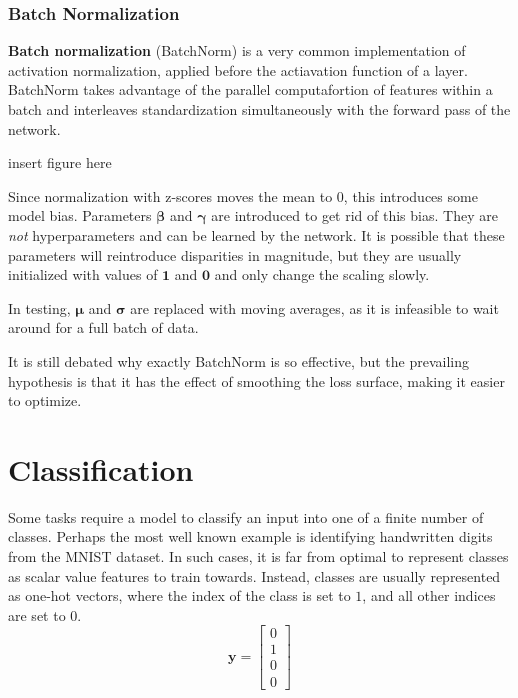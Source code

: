 \documentclass[12pt]{report}
\theoremstyle{definition}
\theoremstyle{remark}
\begin{document}
\subsubsection{Batch Normalization}
\textbf{Batch normalization} (BatchNorm) is a very common implementation of activation normalization, applied before the actiavation function of a layer. BatchNorm takes advantage of the parallel computafortion of features within a batch and interleaves standardization simultaneously with the forward pass of the network.

insert figure here

Since normalization with z-scores moves the mean to $0$, this introduces some model bias. Parameters $\boldsymbol{\beta}$ and $\boldsymbol{\gamma}$ are introduced to get rid of this bias. They are \textit{not} hyperparameters and can be learned by the network. It is possible that these parameters will reintroduce disparities in magnitude, but they are usually initialized with values of $\mathbf{1}$ and $\mathbf{0}$ and only change the scaling slowly.

In testing, $\boldsymbol{\mu}$ and $\boldsymbol{\sigma}$ are replaced with moving averages, as it is infeasible to wait around for a full batch of data.

It is still debated why exactly BatchNorm is so effective, but the prevailing hypothesis is that it has the effect of smoothing the loss surface, making it easier to optimize.
\cite{ioffe_batch_2015}\cite{ioffe_batch_2017}\cite{santurkar_how_2019}

\section{Classification}\label{sec:classification}
Some tasks require a model to classify an input into one of a finite number of classes. Perhaps the most well known example is identifying handwritten digits from the MNIST dataset. In such cases, it is far from optimal to represent classes as scalar value features to train towards. Instead, classes are usually represented as one-hot vectors, where the index of the class is set to $1$, and all other indices are set to $0$.
\begin{equation}
    \mathbf{y} = \begin{bmatrix}
        0 \\
        1 \\
        0 \\
        0
    \end{bmatrix}
\end{equation}
\end{document}
